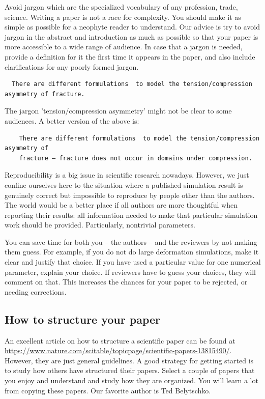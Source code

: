 \documentclass[authoryear,3p,times,preprint,review,fleqn]{elsarticle}
\numberwithin{equation}{section}
\theoremstyle{remark}
\begin{document}
Avoid jargon which are the specialized vocabulary of any profession, trade, science.  Writing a paper is not a race for complexity. You should make it as simple as possible for a neophyte reader to understand.
Our advice is try to avoid jargon in the abstract and introduction as much as possible so that your paper is more accessible to a wide range of audience. In case that a jargon is needed, provide a definition for it the first time it appears in the paper, and also include clarifications for any poorly formed jargon.

 \begin{verbatim}
  There are different formulations  to model the tension/compression asymmetry of fracture.
 \end{verbatim}
The jargon 'tension/compression asymmetry' might not be clear to some audiences. A better version of the above is:

 \begin{verbatim}
    There are different formulations  to model the tension/compression asymmetry of 
    fracture – fracture does not occur in domains under compression.
 \end{verbatim}


Reproducibility is a big issue in scientific research nowadays. However, we just confine ourselves here to the situation where a published simulation result is genuinely correct but impossible to reproduce by people other than the authors. The world would be a better place if all authors are more thoughtful when reporting their results: all information needed to make that particular simulation work should be provided. Particularly, nontrivial parameters.


You can save time for both you -- the authors -- and the reviewers by not making them guess. For example, if you do not do large deformation simulations, make it clear and justify that choice. If you have used a particular value for one numerical parameter, explain your choice. If reviewers have to guess your choices, they will comment on that. This increases the chances for your paper to be rejected, or needing corrections.




\subsection{How to structure your paper}\label{structure}


An excellent article on how to structure a scientific paper can be found at \url{https://www.nature.com/scitable/topicpage/scientific-papers-13815490/}. However, they are just general guidelines. A good strategy for getting started is to study how others have structured their papers. Select a couple of papers that you enjoy and understand and study how they are organized. You will learn a lot from copying these papers. Our favorite author is Ted Belytschko.
\end{document}
